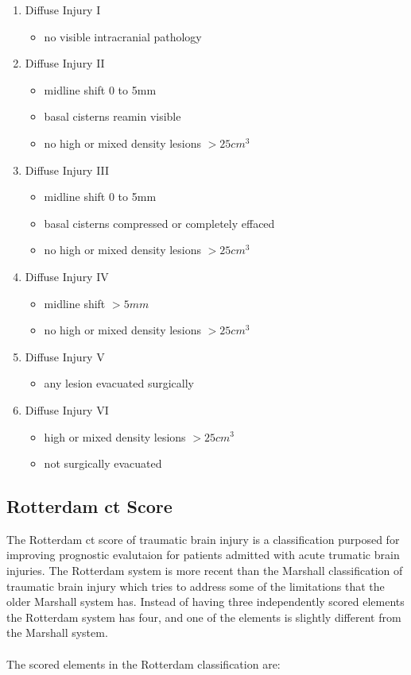 \documentclass[11pt]{article}
\begin{document}
\begin{enumerate}
\item{Diffuse Injury I}
  \begin{itemize}
    \item{no visible intracranial pathology}
  \end{itemize}
\item{Diffuse Injury II}
  \begin{itemize}
   \item{midline shift 0 to 5mm}
    \item{basal cisterns reamin visible}
    \item{no high  or mixed density lesions $>25 cm^3$}
  \end{itemize}
\item{Diffuse Injury III}
  \begin{itemize}
    \item{midline shift 0 to 5mm}
    \item{basal cisterns compressed or completely effaced}
    \item{no high or mixed density lesions $>25cm^3$}
  \end{itemize}
\item{Diffuse Injury IV}
  \begin{itemize}
    \item{midline shift $>5 mm$}
    \item{no high or mixed density lesions $>25cm^3$}
  \end{itemize}
\item{Diffuse Injury V}
  \begin{itemize}
    \item{any lesion evacuated surgically}
  \end{itemize}
\item{Diffuse Injury VI}
  \begin{itemize}
    \item{high or mixed density lesions $>25cm^3$}
    \item{not surgically evacuated}
  \end{itemize}
\end{enumerate}

\subsection{Rotterdam \gls{ct} Score}
The Rotterdam \gls{ct} score of traumatic brain injury is a classification purposed for improving prognostic evalutaion for patients admitted with acute trumatic brain injuries. The Rotterdam system is more recent than the Marshall classification of traumatic brain injury which tries to address some of the limitations that the older Marshall system has. Instead of having three independently scored elements the Rotterdam system has four, and one of the elements is slightly different from the Marshall system.\\
\\
The scored elements in the Rotterdam classification are:
\end{document}
